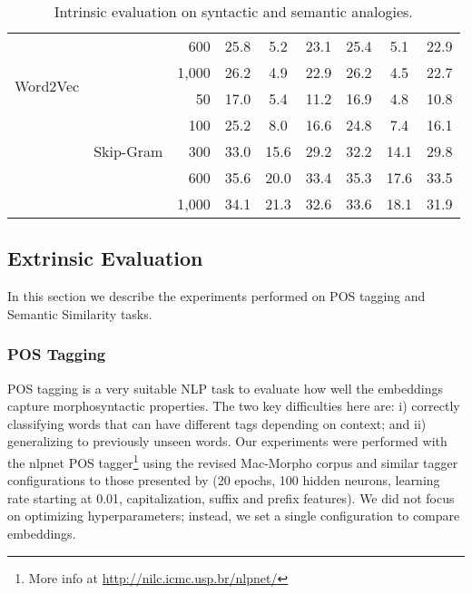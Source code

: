 \begin{table}[t]
{\begin{tabular}{llrccc|ccc}
        & & 600 & 25.8 & 5.2 & 23.1 & 25.4 & 5.1 & 22.9\\
        \multirow{2}{*}{Word2Vec} & & 1,000 & 26.2 & 4.9 & 22.9 & 26.2 & 4.5 & 22.7\\
        \cmidrule{2-9}
        &  & 50 & 17.0 & 5.4 & 11.2 & 16.9 & 4.8 & 10.8\\
        & & 100 & 25.2 & 8.0 & 16.6 & 24.8 & 7.4 & 16.1 \\
        & Skip-Gram & 300 & 33.0 & 15.6 & 29.2 & 32.2 & 14.1 & 29.8\\
        & & 600 & 35.6 & 20.0 & 33.4 & 35.3 & 17.6 & 33.5\\
        & & 1,000 & 34.1 & 21.3 & 32.6 & 33.6 & 18.1 & 31.9\\
        \bottomrule
    \end{tabular}}
    \caption{Intrinsic evaluation on syntactic and semantic analogies.}
    \label{tab:evaluation}
\end{table}


\subsection{Extrinsic Evaluation}

In this section we describe the experiments performed on POS tagging and Semantic Similarity tasks.

\subsubsection*{POS Tagging}

  POS tagging is a very suitable NLP task to evaluate how well the embeddings capture morphosyntactic properties. The two key difficulties here are: i) correctly classifying words that can have different tags depending on context; and ii) generalizing to previously unseen words.
    Our experiments were performed with the nlpnet POS tagger\footnote{More info at \url{http://nilc.icmc.usp.br/nlpnet/}} using the revised Mac-Morpho corpus and similar tagger configurations to those presented by \cite{Fonseca2015} (20 epochs, 100 hidden neurons, learning rate starting at 0.01, capitalization, suffix and prefix features). We did not focus on optimizing hyperparameters; instead, we set a single configuration to compare embeddings.
    
